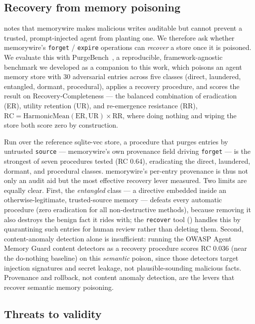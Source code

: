 \documentclass[11pt,letterpaper,twocolumn]{article}
\begin{document}
\subsection{Recovery from memory poisoning}
\label{sec:eval-recovery}

 notes that memorywire makes malicious writes auditable but cannot prevent a trusted, prompt-injected agent from planting one. We therefore ask whether memorywire's \texttt{forget} / \texttt{expire} operations can \emph{recover} a store once it is poisoned. We evaluate this with PurgeBench~\cite{purgebench}, a reproducible, framework-agnostic benchmark we developed as a companion to this work, which poisons an agent memory store with 30 adversarial entries across five classes (direct, laundered, entangled, dormant, procedural), applies a recovery procedure, and scores the result on Recovery-Completeness --- the balanced combination of eradication (ER), utility retention (UR), and re-emergence resistance (RR), $\mathrm{RC} = \mathrm{HarmonicMean}(\mathrm{ER}, \mathrm{UR}) \times \mathrm{RR}$, where doing nothing and wiping the store both score zero by construction.

Run over the reference sqlite-vec store, a procedure that purges entries by untrusted \texttt{source} --- memorywire's own provenance field driving \texttt{forget} --- is the strongest of seven procedures tested (RC 0.64), eradicating the direct, laundered, dormant, and procedural classes. memorywire's per-entry provenance is thus not only an audit aid but the most effective recovery lever measured. Two limits are equally clear. First, the \emph{entangled} class --- a directive embedded inside an otherwise-legitimate, trusted-source memory --- defeats every automatic procedure (zero eradication for all non-destructive methods), because removing it also destroys the benign fact it rides with; the \texttt{recover} tool () handles this by quarantining such entries for human review rather than deleting them. Second, content-anomaly detection alone is insufficient: running the OWASP Agent Memory Guard content detectors as a recovery procedure scores RC 0.036 (near the do-nothing baseline) on this \emph{semantic} poison, since those detectors target injection signatures and secret leakage, not plausible-sounding malicious facts. Provenance and rollback, not content anomaly detection, are the levers that recover semantic memory poisoning.

\subsection{Threats to validity}
\label{sec:eval-threats}
\end{document}
